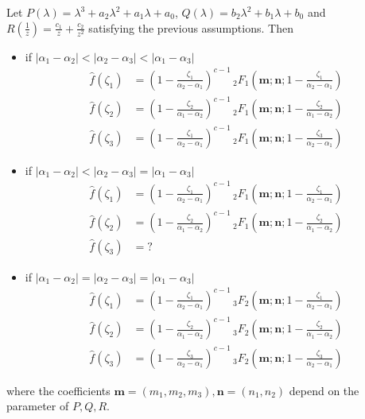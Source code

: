 \documentclass[11pt,a4paper,twoside,leqno,noamsfonts]{amsart}
\numberwithin{equation}{section}
\begin{document}
\begin{prop}
Let $P(\lambda)=\lambda^3+a_2\lambda^2+a_1\lambda+a_0$, $Q(\lambda)=b_2\lambda^2+b_1\lambda+b_0$ and $R(\tfrac{1}{z})=\tfrac{c_1}{z}+\tfrac{c_2}{z^2}$ satisfying the previous assumptions. Then 
\begin{itemize}
\item if $|\alpha_1-\alpha_2|<|\alpha_2-\alpha_3|<|\alpha_1-\alpha_3|$
\color{red}
\begin{align}
\hat{f}(\zeta_1)&=\left(1-\frac{\zeta_1}{\alpha_2-\alpha_1}\right)^{c-1} \, {}_2F_1\left(\mathbf{m};\mathbf{n};1-\frac{\zeta_1}{\alpha_2-\alpha_1} \right)\\
\hat{f}(\zeta_2)&=\left(1-\frac{\zeta_2}{\alpha_1-\alpha_2}\right)^{c-1} \, {}_2F_1\left(\mathbf{m};\mathbf{n};1-\frac{\zeta_2}{\alpha_1-\alpha_2} \right)\\
\hat{f}(\zeta_3)&=\left(1-\frac{\zeta_1}{\alpha_2-\alpha_1}\right)^{c-1} \, {}_2F_1\left(\mathbf{m};\mathbf{n};1-\frac{\zeta_3}{\alpha_2-\alpha_1} \right)
\end{align}
\color{black}
\item if $|\alpha_1-\alpha_2|<|\alpha_2-\alpha_3|=|\alpha_1-\alpha_3|$
\color{red}
\begin{align}
\hat{f}(\zeta_1)&=\left(1-\frac{\zeta_1}{\alpha_2-\alpha_1}\right)^{c-1} \, {}_2F_1\left(\mathbf{m};\mathbf{n};1-\frac{\zeta_1}{\alpha_2-\alpha_1} \right)\\
\hat{f}(\zeta_2)&=\left(1-\frac{\zeta_2}{\alpha_1-\alpha_2}\right)^{c-1} \, {}_2F_1\left(\mathbf{m};\mathbf{n};1-\frac{\zeta_2}{\alpha_1-\alpha_2} \right)\\
\hat{f}(\zeta_3)&=?
\end{align}
\color{black}
\item if $|\alpha_1-\alpha_2|=|\alpha_2-\alpha_3|=|\alpha_1-\alpha_3|$ 
\color{red}
\begin{align}
\hat{f}(\zeta_1)&=\left(1-\frac{\zeta_1}{\alpha_2-\alpha_1}\right)^{c-1} \, {}_3F_2\left(\mathbf{m};\mathbf{n};1-\frac{\zeta_1}{\alpha_2-\alpha_1} \right)\\
\hat{f}(\zeta_2)&=\left(1-\frac{\zeta_2}{\alpha_1-\alpha_2}\right)^{c-1} \, {}_3F_2\left(\mathbf{m};\mathbf{n};1-\frac{\zeta_2}{\alpha_1-\alpha_2} \right)\\
\hat{f}(\zeta_3)&=\left(1-\frac{\zeta_3}{\alpha_2-\alpha_1}\right)^{c-1} \, {}_3F_2\left(\mathbf{m};\mathbf{n};1-\frac{\zeta_3}{\alpha_2-\alpha_1} \right)
\end{align}

\end{itemize}

\color{black}
where the coefficients $\mathbf{m}=(m_1,m_2,m_3),\mathbf{n}=(n_1,n_2)$ depend on the parameter of $P,Q,R$. 
\end{prop}
\end{document}
